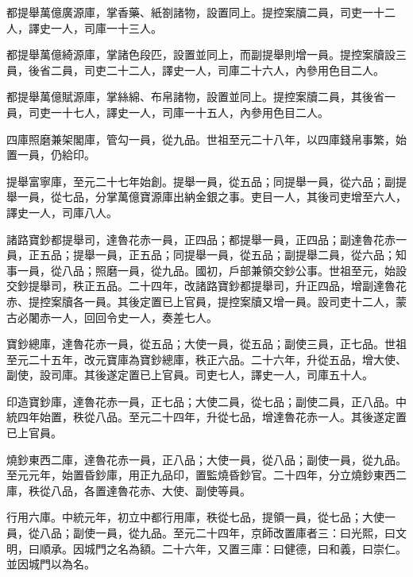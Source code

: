 \begin{pinyinscope}
 都提舉萬億廣源庫，掌香藥、紙劄諸物，設置同上。提控案牘二員，司吏一十二人，譯史一人，司庫一十三人。



 都提舉萬億綺源庫，掌諸色段匹，設置並同上，而副提舉則增一員。提控案牘設三員，後省二員，司吏二十二人，譯史一人，司庫二十六人，內參用色目二人。



 都提舉萬億賦源庫，掌絲綿、布帛諸物，設置並同上。提控案牘二員，其後省一員，司吏一十七人，譯史一人，司庫一十五人，內參用色目二人。



 四庫照磨兼架閣庫，管勾一員，從九品。世祖至元二十八年，以四庫錢帛事繁，始置一員，仍給印。



 提舉富寧庫，至元二十七年始創。提舉一員，從五品；同提舉一員，從六品；副提舉一員，從七品，分掌萬億寶源庫出納金銀之事。吏目一人，其後司吏增至六人，譯史一人，司庫八人。



 諸路寶鈔都提舉司，達魯花赤一員，正四品；都提舉一員，正四品；副達魯花赤一員，正五品；提舉一員，正五品；同提舉一員，從五品；副提舉二員，從六品；知事一員，從八品；照磨一員，從九品。國初，戶部兼領交鈔公事。世祖至元，始設交鈔提舉司，秩正五品。二十四年，改諸路寶鈔都提舉司，升正四品，增副達魯花赤、提控案牘各一員。其後定置已上官員，提控案牘又增一員。設司吏十二人，蒙古必闍赤一人，回回令史一人，奏差七人。



 寶鈔總庫，達魯花赤一員，從五品；大使一員，從五品；副使三員，正七品。世祖至元二十五年，改元寶庫為寶鈔總庫，秩正六品。二十六年，升從五品，增大使、副使，設司庫。其後遂定置已上官員。司吏七人，譯史一人，司庫五十人。



 印造寶鈔庫，達魯花赤一員，正七品；大使二員，從七品；副使二員，正八品。中統四年始置，秩從八品。至元二十四年，升從七品，增達魯花赤一人。其後遂定置已上官員。



 燒鈔東西二庫，達魯花赤一員，正八品；大使一員，從八品；副使一員，從九品。至元元年，始置昏鈔庫，用正九品印，置監燒昏鈔官。二十四年，分立燒鈔東西二庫，秩從八品，各置達魯花赤、大使、副使等員。



 行用六庫。中統元年，初立中都行用庫，秩從七品，提領一員，從七品；大使一員，從八品；副使一員，從九品。至元二十四年，京師改置庫者三：曰光熙，曰文明，曰順承。因城門之名為額。二十六年，又置三庫：曰健德，曰和義，曰崇仁。並因城門以為名。




\end{pinyinscope}
